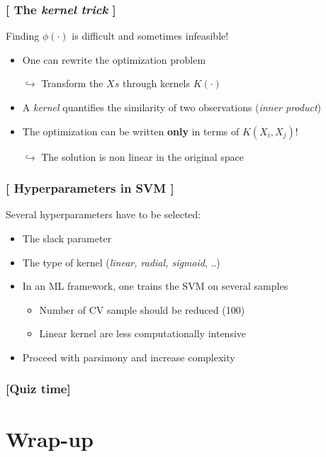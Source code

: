 \documentclass[xcolor=x11names,compress]{beamer}
\renewcommand{\(}{\begin{columns}}
\renewcommand{\)}{\end{columns}}
\newcommand{\<}[1]{\begin{column}{#1}}
\renewcommand{\>}{\end{column}}
\begin{document}
\begin{frame}
\frametitle{\textcolor{brique}{[ The \textit{kernel trick} ]}}
Finding $\phi(\cdot)$ is difficult and sometimes infeasible!
\pause
\begin{itemize}[<+->]
   \item One can rewrite the optimization problem
    \item[$\hookrightarrow$] Transform the $Xs$ through kernels $K(\cdot)$
    \item A \emph{kernel} quantifies the similarity of two observations (\textit{inner product})
    \item The optimization can be written \textbf{only} in terms of $K(X_i, X_j)$!
    \item[$\hookrightarrow$] The solution is non linear in the  original space
\end{itemize}
\end{frame}


\begin{frame}
\frametitle{\textcolor{brique}{[ Hyperparameters in SVM ]}}
Several hyperparameters have to be selected:
\pause
\begin{itemize}[<+->]
   \item The slack parameter
   \item The type of kernel (\textit{linear, radial, sigmoid}, ..)
   \item In an ML framework,  one trains the SVM on several samples
   \begin{itemize}[<+->]
        \item Number of CV sample should be reduced (100)
        \item Linear kernel are less computationally intensive
    \end{itemize}
    \item Proceed with parsimony and increase complexity
\end{itemize}
\end{frame}

\begin{frame} %
\frametitle{\textcolor{brique}{[Quiz time]}}
\pause
\begin{itemize}[<+->]
  \item[]
\end{itemize}
\end{frame}


\section{Wrap-up}
\end{document}
